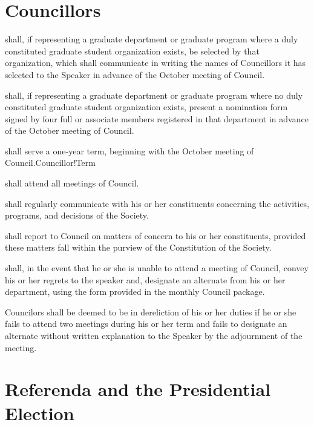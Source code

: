 \section{Councillors}
\begin{longenum}[ label*=\thesection.\arabic*., align=left]
	\item shall, if representing a graduate department or graduate program where a duly constituted graduate student organization exists, be selected by that organization, which shall communicate in writing the names of Councillors it has selected to the Speaker in advance of the October meeting of Council. 
    \item shall, if representing a graduate department or graduate program where no duly constituted graduate student organization  exists, present a nomination form signed by four full or associate members registered in that department in advance of the October meeting of Council. 
    \item shall serve a one-year term, beginning with the October meeting of Council.{Councillor!Term}
    \item shall attend all meetings of Council.
    \item shall regularly communicate with his or her constituents concerning the activities, programs, and decisions of the Society. 
    \item shall report to Council on matters of concern to his or her constituents, provided these matters fall within the purview of the Constitution of the Society. 
    \item shall, in the event that he or she is unable to attend a meeting of Council, convey his or her regrets to the speaker and, designate an alternate from his or her department, using the form provided in the monthly Council package.
    \item Councilors shall be deemed to be in dereliction of his or her duties if he or she fails to attend two meetings during his or her term and fails to designate an alternate without written explanation to the Speaker by the adjournment  of the meeting. 
\end{longenum}
\newpage

\section{Referenda and the Presidential Election} 
